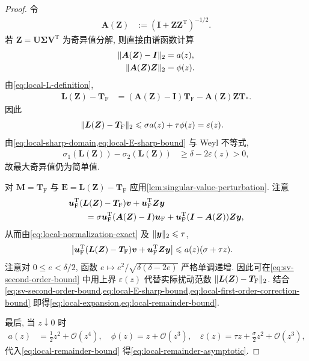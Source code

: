 \documentclass{ctexart}
\newcommand{\q}{\quad}
\newcommand{\T}{\mathrm{T}}
\renewcommand{\O}{\mathcal{O}}
\newcommand{\dt}{\delta}
\renewcommand{\ge}{\geqslant}
\renewcommand{\le}{\leqslant}
\DeclarePairedDelimiter\norm{\lVert}{\rVert}
\DeclarePairedDelimiter\abs{\lvert}{\rvert}
\begin{document}
\begin{proof}
令
\begin{align}
    \bm A(\bm Z)&:=(\bm I+\bm Z\bm Z^\T)^{-1/2}.
    \label{eq:local-normalization-matrix}
\end{align}
若 $\bm Z=\bm U\bm\Sigma\bm V^\T$ 为奇异值分解, 则直接由谱函数计算
\begin{align}
    \norm{\bm A(\bm Z)-\bm I}_2&=a(z),
    \label{eq:local-normalization-exact}\\
    \norm{\bm A(\bm Z)\bm Z}_2&=\phi(z).
    \label{eq:local-AZ-exact}
\end{align}
由\cref{eq:local-L-definition},
\begin{align}
    \bm L(\bm Z)-\bm T_{\mathrm F}
    &=(\bm A(\bm Z)-\bm I)\bm T_{\mathrm F}
      -\bm A(\bm Z)\bm Z\bm T_\ast.
    \label{eq:local-L-perturbation-split}
\end{align}
因此
\begin{align}
    \norm{\bm L(\bm Z)-\bm T_{\mathrm F}}_2
    &\le \sigma a(z)+\tau\phi(z)
     =\varepsilon(z).
    \label{eq:local-E-sharp-bound}
\end{align}
由\cref{eq:local-sharp-domain,eq:local-E-sharp-bound} 与 Weyl 不等式,
\begin{align}
    \sigma_1(\bm L(\bm Z))-\sigma_2(\bm L(\bm Z))
    &\ge\dt-2\varepsilon(z)>0,
    \label{eq:local-gap-preservation}
\end{align}
故最大奇异值仍为简单值.

对 $\bm M=\bm T_{\mathrm F}$ 与 $\bm E=\bm L(\bm Z)-\bm T_{\mathrm F}$ 应用\cref{lem:singular-value-perturbation}. 注意
\begin{align}
    &\bm u_{\mathrm F}^\T(\bm L(\bm Z)-\bm T_{\mathrm F})\bm v
      +\bm u_{\mathrm F}^\T\bm Z\bm y\notag\\
    &\qquad=
      \sigma\bm u_{\mathrm F}^\T(\bm A(\bm Z)-\bm I)\bm u_{\mathrm F}
      +\bm u_{\mathrm F}^\T(\bm I-\bm A(\bm Z))\bm Z\bm y,
    \label{eq:local-first-order-correction}
\end{align}
从而由\cref{eq:local-normalization-exact} 及 $\norm{\bm y}_2\le\tau$,
\begin{align}
    \abs*{
      \bm u_{\mathrm F}^\T(\bm L(\bm Z)-\bm T_{\mathrm F})\bm v
      +\bm u_{\mathrm F}^\T\bm Z\bm y}
    &\le a(z)(\sigma+\tau z).
    \label{eq:local-first-order-correction-bound}
\end{align}
注意对 $0\le e<\dt/2$, 函数
$e\mapsto e^2/\sqrt{\dt(\dt-2e)}$ 严格单调递增.
因此可在\cref{eq:sv-second-order-bound} 中用上界
$\varepsilon(z)$ 代替实际扰动范数
$\norm{\bm L(\bm Z)-\bm T_{\mathrm F}}_2$.
结合\cref{eq:sv-second-order-bound,eq:local-E-sharp-bound,eq:local-first-order-correction-bound} 即得\cref{eq:local-expansion,eq:local-remainder-bound}.

最后, 当 $z\downarrow0$ 时
\begin{align}
    a(z)&=\frac12z^2+\O(z^4),\q
    \phi(z)=z+\O(z^3),\q
    \varepsilon(z)=\tau z+\frac\sigma2z^2+\O(z^3),
    \label{eq:local-small-z-expansions}
\end{align}
代入\cref{eq:local-remainder-bound} 得\cref{eq:local-remainder-asymptotic}.
\end{proof}
\end{document}
